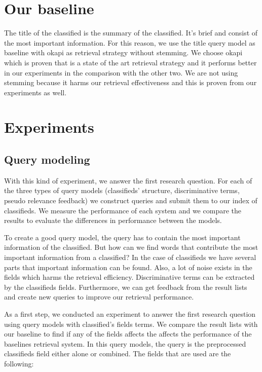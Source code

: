 \section{Our baseline}
The title of the classified is the summary of the classified. It's brief and consist of the most important information. For this reason, we use the title query model as baseline with okapi as retrieval strategy without stemming. We choose okapi which is proven that is a state of the art retrieval strategy and it performs better in our experiments in the comparison with the other two. We are not using stemming because it harms our retrieval effectiveness and this is proven from our experiments as well.


\section{Experiments}

\subsection{Query modeling}
With this kind of experiment, we answer the first research question. For each of the three types of query models (classifieds' structure, discriminative terms, pseudo relevance feedback) we construct queries and submit them to our index of classifieds. We measure the performance of each system and we compare the results to evaluate the differences in performance between the models.


To create a good query model, the query has to contain the most important information of the classified. But how can we find words that contribute the most important information from a classified? In the case of classifieds we have several parts that important information can be found. Also, a lot of noise exists in the fields which harms the retrieval efficiency. Discriminative terms can be extracted by the classifieds fields. Furthermore, we can get feedback from the result lists and create new queries to improve our retrieval performance.

As a first step, we conducted an experiment to answer the first research question using query models with classified’s fields terms. We compare the result lists with our baseline to find if any of the fields affects the affects the performance of the baselines retrieval system. In this query models, the query is the preprocessed classifieds field either alone or combined. The fields that are used are the following:

